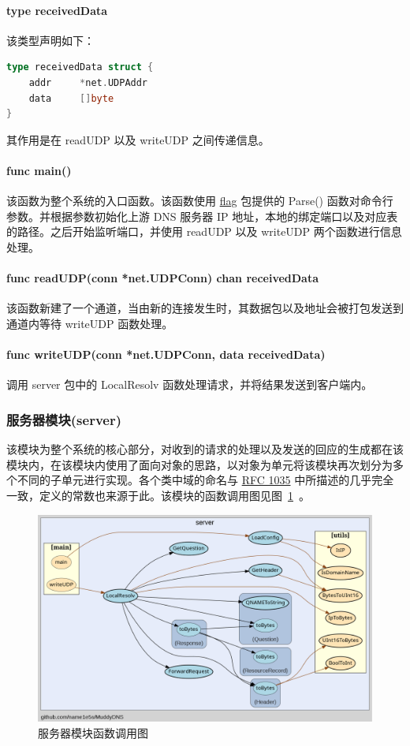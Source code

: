 \documentclass[blue,normal,cn]{elegantnote}
\begin{document}
\paragraph{type receivedData} 该类型声明如下：
\begin{lstlisting}[language=go]
type receivedData struct {
    addr     *net.UDPAddr
    data     []byte
}
\end{lstlisting}
其作用是在 readUDP 以及 writeUDP 之间传递信息。

\paragraph{func main()} 该函数为整个系统的入口函数。该函数使用 \href{https://golang.org/pkg/flag/}{flag} 包提供的 Parse() 函数对命令行参数。并根据参数初始化上游 DNS 服务器 IP 地址，本地的绑定端口以及对应表的路径。之后开始监听端口，并使用 readUDP 以及 writeUDP 两个函数进行信息处理。

\paragraph{func readUDP(conn *net.UDPConn) chan receivedData} 该函数新建了一个通道，当由新的连接发生时，其数据包以及地址会被打包发送到通道内等待 writeUDP 函数处理。

\paragraph{func writeUDP(conn *net.UDPConn, data receivedData)} 调用 server 包中的 LocalResolv 函数处理请求，并将结果发送到客户端内。

\subsubsection{服务器模块(server)}
该模块为整个系统的核心部分，对收到的请求的处理以及发送的回应的生成都在该模块内，在该模块内使用了面向对象的思路，以对象为单元将该模块再次划分为多个不同的子单元进行实现。各个类中域的命名与 \href{https://tools.ietf.org/html/rfc1035}{RFC 1035} 中所描述的几乎完全一致，定义的常数也来源于此。该模块的函数调用图见图~\ref{call_server}~。
\begin{figure}[!htbp]
	\centering
	\includegraphics[width=.9\textwidth]{call_server.png}
	\caption{服务器模块函数调用图}
	\label{call_server}
\end{figure}
\end{document}
